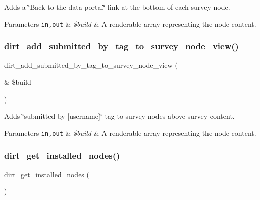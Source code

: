 Adds a \char`\"{}\+Back to the data portal\char`\"{} link at the bottom of each survey node.


\begin{DoxyParams}[1]{Parameters}
\mbox{\tt in,out}  & {\em \$build} & A renderable array representing the node content. \\
\hline
\end{DoxyParams}
\mbox{\label{dirt_8nodes_8inc_ae9947827b646698ed3ee6d30b6534deb}} 
\subsubsection{\texorpdfstring{dirt\+\_\+add\+\_\+submitted\+\_\+by\+\_\+tag\+\_\+to\+\_\+survey\+\_\+node\+\_\+view()}{dirt\_add\_submitted\_by\_tag\_to\_survey\_node\_view()}}
{\footnotesize\ttfamily dirt\+\_\+add\+\_\+submitted\+\_\+by\+\_\+tag\+\_\+to\+\_\+survey\+\_\+node\+\_\+view (\begin{DoxyParamCaption}\item[{\&}]{\$build }\end{DoxyParamCaption})}

Adds \char`\"{}submitted by \mbox{[}username\mbox{]}\char`\"{} tag to survey nodes above survey content.


\begin{DoxyParams}[1]{Parameters}
\mbox{\tt in,out}  & {\em \$build} & A renderable array representing the node content. \\
\hline
\end{DoxyParams}
\mbox{\label{dirt_8nodes_8inc_aea18b078b62c937a9574d17c3a4a2805}} 
\subsubsection{\texorpdfstring{dirt\+\_\+get\+\_\+installed\+\_\+nodes()}{dirt\_get\_installed\_nodes()}}
{\footnotesize\ttfamily dirt\+\_\+get\+\_\+installed\+\_\+nodes (\begin{DoxyParamCaption}{ }\end{DoxyParamCaption})}

